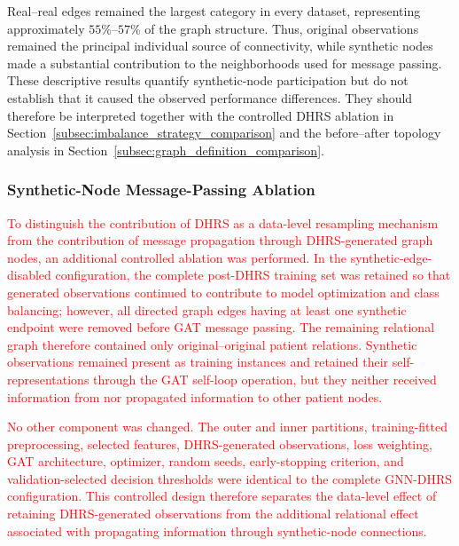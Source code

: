 \documentclass[pdflatex,sn-mathphys-num]{sn-jnl}%
\theoremstyle{thmstyleone}%
\theoremstyle{thmstyletwo}%
\theoremstyle{thmstylethree}%
\begin{document}
 {
Real--real edges remained the largest category in every dataset, representing
approximately \(55\%\)--\(57\%\) of the graph structure. Thus, original
observations remained the principal individual source of connectivity, while
synthetic nodes made a substantial contribution to the neighborhoods used for
message passing. These descriptive results quantify synthetic-node
participation but do not establish that it caused the observed performance
differences. They should therefore be interpreted together with the controlled
DHRS ablation in Section~\ref{subsec:imbalance_strategy_comparison} and the
before--after topology analysis in
Section~\ref{subsec:graph_definition_comparison}.
}


\subsubsection{Synthetic-Node Message-Passing Ablation}
\label{subsubsec:synthetic_edge_ablation}

\textcolor{red}{
To distinguish the contribution of DHRS as a data-level resampling mechanism
from the contribution of message propagation through DHRS-generated graph
nodes, an additional controlled ablation was performed. In the
synthetic-edge-disabled configuration, the complete post-DHRS training set was
retained so that generated observations continued to contribute to model
optimization and class balancing; however, all directed graph edges having at
least one synthetic endpoint were removed before GAT message passing. The
remaining relational graph therefore contained only original--original
patient relations. Synthetic observations remained present as training
instances and retained their self-representations through the GAT self-loop
operation, but they neither received information from nor propagated
information to other patient nodes.
}

\textcolor{red}{
No other component was changed. The outer and inner partitions,
training-fitted preprocessing, selected features, DHRS-generated observations,
loss weighting, GAT architecture, optimizer, random seeds, early-stopping
criterion, and validation-selected decision thresholds were identical to the
complete GNN-DHRS configuration. This controlled design therefore separates
the data-level effect of retaining DHRS-generated observations from the
additional relational effect associated with propagating information through
synthetic-node connections.
}
\end{document}
